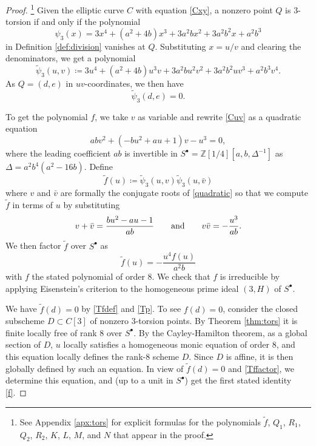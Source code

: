\documentclass{gtpart}
\theoremstyle{definition}
\theoremstyle{remark}
\newcommand{\mb}[1]{\mathbb{#1}}
\newcommand{\BZ}{{\mb Z}}
\newcommand{\Tf}{\widetilde{f}}
\newcommand{\Tp}{\widetilde{\psi}}
\newcommand{\ad}{{\rm and}}
\newcommand{\s}{S^\bullet}
\newcommand{\ce}{\coloneqq}
\numberwithin{equation}{section}
\numberwithin{thm}{section}
\begin{document}
\begin{proof}
 \footnote{See Appendix \ref{apx:tors} for explicit formulas for the 
 polynomials $\Tf$, $Q_1$, $R_1$, $Q_2$, $R_2$, $K$, $L$, $M$, and $N$ 
 that appear in the proof.  }
 Given the elliptic curve $C$ with equation \eqref{Cxy}, a nonzero point 
 $Q$ is 3-torsion if and only if the polynomial 
 \begin{equation}
 \label{psi_3}
  \psi_3 (x) = 3 x^4 + (a^2 + 4 b) x^3 + 3 a^2 b x^2 + 3 a^2 b^2 x 
  + a^2 b^3 
 \end{equation}
 in Definition \ref{def:division} vanishes at $Q$.  Substituting 
 $x = u/v$ and clearing the denominators, we get a polynomial 
 \[
  \Tp_3(u,v) \ce 3 u^4 + (a^2 + 4 b) u^3 v + 3 a^2 b u^2 v^2 
  + 3 a^2 b^2 u v^3 + a^2 b^3 v^4.  
 \]
 As $Q = (d,e)$ in $uv$-coordinates, we then have 
 \begin{equation}
 \label{Tp}
  \Tp_3(d,e) = 0.  
 \end{equation}

 To get the polynomial $f$, we take $v$ as variable and rewrite 
 \eqref{Cuv} as a quadratic equation 
 \begin{equation}
 \label{quadratic}
  a b v^2 + (-b u^2 + a u + 1) v - u^3 = 0, 
 \end{equation}
 where the leading coefficient $a b$ is invertible in 
 $\s = \BZ [1/4] [a, b, \Delta^{-1}]$ as 
 $\Delta = a^2 b^4 (a^2 - 16 b)$.  Define 
 \begin{equation}
 \label{Tfdef}
  \Tf(u) \ce \Tp_3(u,v) \Tp_3(u,\bar{v}) 
 \end{equation}
 where $v$ and $\bar{v}$ are formally the conjugate roots of 
 \eqref{quadratic} so that we compute $\Tf$ in terms of $u$ by 
 substituting 
 \[
  v + \bar{v} = \frac{b u^2 - a u - 1}{a b} \qquad \ad \qquad 
  v \bar{v} = -\frac{u^3}{a b}.  
 \]
 We then factor $\Tf$ over $\s$ as 
 \begin{equation}
 \label{Tffactor}
  \Tf(u) = -\frac{u^4 f(u)}{a^2 b} 
 \end{equation}
 with $f$ the stated polynomial of order 8.  We check that $f$ is 
 irreducible by applying Eisenstein's criterion to the homogeneous prime 
 ideal $(3,H)$ of $\s$.  

 We have $\Tf(d) = 0$ by \eqref{Tfdef} and \eqref{Tp}.  To see 
 $f(d) = 0$, consider the closed subscheme $D \subset C[3]$ of nonzero 
 3-torsion points.  By Theorem \ref{thm:tors} it is finite locally free 
 of rank 8 over $\s$.  By the Cayley-Hamilton theorem, as a global 
 section of $D$, $u$ locally satisfies a homogeneous monic equation of 
 order 8, and this equation locally defines the rank-8 scheme $D$.  
 Since $D$ is affine, it is then globally defined by such an equation.  
 In view of $\Tf(d) = 0$ and \eqref{Tffactor}, we determine this 
 equation, and (up to a unit in $\s$) get the first stated identity 
 \eqref{f}.  


\end{proof}
\end{document}

